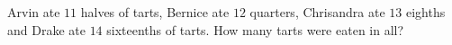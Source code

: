 Arvin ate $11$ halves of tarts, Bernice ate $12$ quarters, Chrisandra ate $13$ eighths and Drake ate $14$ sixteenths of tarts. How many tarts were eaten in all?
